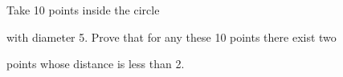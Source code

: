 Take 10 points inside the circle 

with diameter 5. Prove that for any these 10 points there exist two 

points whose distance is less than 2.
